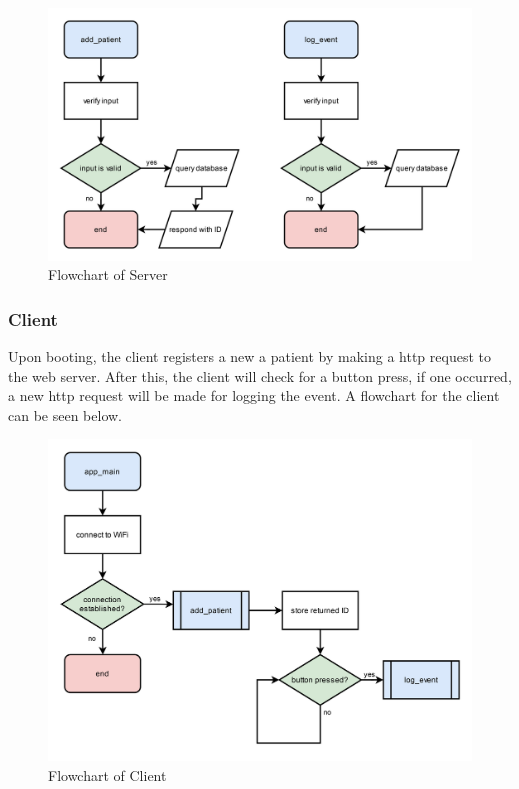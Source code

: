 \begin{figure}[H]
    \begin{center}
    \includegraphics[width=\textwidth]{images/flowchart-server}
    \end{center}
    \caption{Flowchart of Server}
\end{figure}

\subsubsection{Client}

Upon booting, the client registers a new a patient by making a \gls{http} request to the web server.
After this, the client will check for a button press, if one occurred, a new \gls{http} request will be made for logging the event.
A flowchart for the client can be seen below.

\begin{figure}[H]
    \begin{center}
    \includegraphics[width=\textwidth]{images/flowchart-client}
    \end{center}
    \caption{Flowchart of Client}
\end{figure}

